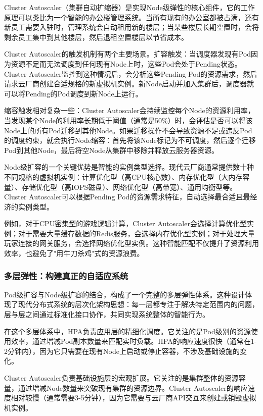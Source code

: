 Cluster Autoscaler（集群自动扩缩器）是实现Node级弹性的核心组件，它的工作原理可以类比为一个智能的办公楼管理系统。当所有现有的办公室都被占满，还有新员工需要入驻时，管理系统会自动租用新的楼层；当某些楼层长期空置时，会将剩余员工集中到其他楼层，然后退租空置楼层以节省成本。

Cluster Autoscaler的触发机制有两个主要场景。扩容触发：当调度器发现有Pod因为资源不足而无法调度到任何现有Node上时，这些Pod会处于Pending状态。Cluster Autoscaler监控到这种情况后，会分析这些Pending Pod的资源需求，然后请求云厂商创建合适规格的新虚拟机实例。新Node启动并加入集群后，调度器就可以将Pending的Pod调度到新Node上运行。

缩容触发相对复杂一些：Cluster Autoscaler会持续监控每个Node的资源利用率，当发现某个Node的利用率长期低于阈值（通常是50\%）时，会评估是否可以将该Node上的所有Pod迁移到其他Node。如果迁移操作不会导致资源不足或违反Pod的调度约束，就会执行Node缩容：首先将该Node标记为不可调度，然后逐个迁移Pod到其他Node，最后将空Node从集群中移除并释放云服务器资源。

Node级扩容的一个关键优势是智能的实例类型选择。现代云厂商通常提供数十种不同规格的虚拟机实例：计算优化型（高CPU核心数）、内存优化型（大内存容量）、存储优化型（高IOPS磁盘）、网络优化型（高带宽）、通用均衡型等。Cluster Autoscaler可以根据Pending Pod的资源需求特征，自动选择最合适且最经济的实例类型。

例如，对于CPU密集型的游戏逻辑计算，Cluster Autoscaler会选择计算优化型实例；对于需要大量缓存数据的Redis服务，会选择内存优化型实例；对于处理大量玩家连接的网关服务，会选择网络优化型实例。这种智能匹配不仅提升了资源利用效率，也避免了"用牛刀杀鸡"式的资源浪费。

\subsubsection{多层弹性：构建真正的自适应系统}

Pod级扩容与Node级扩容的结合，构成了一个完整的多层弹性体系。这种设计体现了现代分布式系统的层次化架构思想：每一层都专注于解决特定范围内的问题，层与层之间通过标准化接口协作，共同实现系统整体的智能行为。

在这个多层体系中，HPA负责应用层的精细化调度。它关注的是Pod级别的资源使用效率，通过增减Pod副本数量来匹配实时负载。HPA的响应速度很快（通常在1-2分钟内），因为它只需要在现有Node上启动或停止容器，不涉及基础设施的变化。

Cluster Autoscaler负责基础设施层的宏观扩展。它关注的是集群整体的资源容量，通过增减Node数量来突破现有集群的资源边界。Cluster Autoscaler的响应速度相对较慢（通常需要3-5分钟），因为它需要与云厂商API交互来创建或销毁虚拟机实例。

